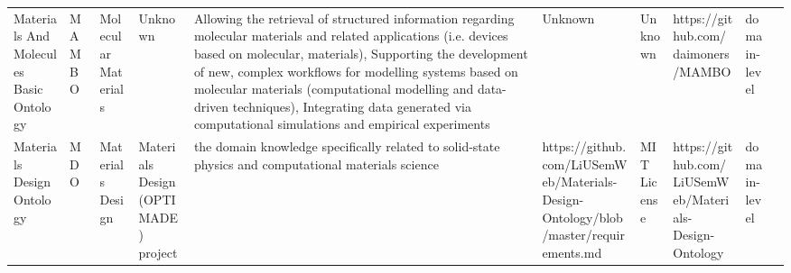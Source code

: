 \begin{tabular}{llllllllll}
                                           Materials And Molecules Basic Ontology &                   MAMBO &                         Molecular Materials &                                                                                                                                                                                                                                                                                                                                                              Unknown & Allowing the retrieval of structured information regarding molecular materials and related applications (i.e. devices based on molecular, materials), Supporting the development of new, complex workflows for modelling systems based on molecular materials (computational modelling and data-driven techniques), Integrating data generated via computational simulations and empirical experiments &                                                                                                            Unknown &                                      Unknown &                                                                https://github.com/daimoners/MAMBO  &      domain-level \\
                                                        Materials Design Ontology &                     MDO &                            Materials Design &                                                                                                                                                                                                                                                                                                                                  Materials Design (OPTIMADE) project &                                                                                                                                                                                                                                                                                                   the domain knowledge specifically related to solid-state physics and computational materials science &                                 https://github.com/LiUSemWeb/Materials-Design-Ontology/blob/master/requirements.md &                                  MIT License &                                            https://github.com/LiUSemWeb/Materials-Design-Ontology  &      domain-level \\

\end{tabular}
